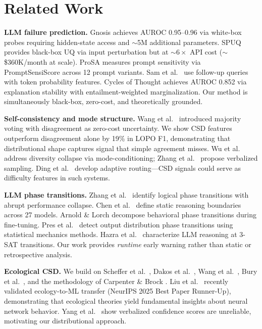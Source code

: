 \documentclass[11pt,letterpaper]{article}
\begin{document}
\section{Related Work}
\label{sec:related}

\textbf{LLM failure prediction.} Gnosis \cite{ghasemabadi2025gnosis} achieves AUROC 0.95--0.96 via white-box probes requiring hidden-state access and ${\sim}$5M additional parameters. SPUQ \cite{gao2024spuq} provides black-box UQ via input perturbation but at ${\sim}6{\times}$ API cost (${\sim}$\$360K/month at scale). ProSA \cite{zhuo2024prosa} measures prompt sensitivity via PromptSensiScore across 12 prompt variants. Sam et al.\ \cite{sam2025predicting} use follow-up queries with token probability features. Cycles of Thought \cite{cycles2024} achieves AUROC 0.852 via explanation stability with entailment-weighted marginalization. Our method is simultaneously black-box, zero-cost, and theoretically grounded.

\textbf{Self-consistency and mode structure.} Wang et al.\ \cite{wang2023selfconsistency} introduced majority voting with disagreement as zero-cost uncertainty. We show CSD features outperform disagreement alone by 19\% in LOPO F1, demonstrating that distributional shape captures signal that simple agreement misses. Wu et al.\ \cite{wu2025modec} address diversity collapse via mode-conditioning; Zhang et al.\ \cite{zhang2025verbalized} propose verbalized sampling. Ding et al.\ \cite{ding2025bestroute} develop adaptive routing---CSD signals could serve as difficulty features in such systems.

\textbf{LLM phase transitions.} Zhang et al.\ \cite{zhang2026logical} identify logical phase transitions with abrupt performance collapse. Chen et al.\ \cite{chen2024reasoning} define static reasoning boundaries across 27 models. Arnold \& Lorch \cite{arnold2025} decompose behavioral phase transitions during fine-tuning. Pres et al.\ \cite{pres2025phase} detect output distribution phase transitions using statistical mechanics methods. Hazra et al.\ \cite{hazra2025} characterize LLM reasoning at 3-SAT transitions. Our work provides \emph{runtime} early warning rather than static or retrospective analysis.

\textbf{Ecological CSD.} We build on Scheffer et al.\ \cite{scheffer2009, scheffer2012}, Dakos et al.\ \cite{dakos2012methods, dakos2013}, Wang et al.\ \cite{wang2012flickering}, Bury et al.\ \cite{bury2021}, and the methodology of Carpenter \& Brock \cite{carpenter2006}. Liu et al.\ \cite{liu2025superposition} recently validated ecology-to-ML transfer (NeurIPS 2025 Best Paper Runner-Up), demonstrating that ecological theories yield fundamental insights about neural network behavior. Yang et al.\ \cite{yang2024verbalized} show verbalized confidence scores are unreliable, motivating our distributional approach.
\end{document}
